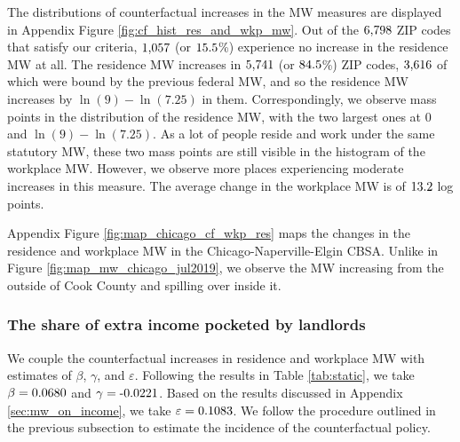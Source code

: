 The distributions of counterfactual increases in the MW measures are displayed 
in Appendix Figure \ref{fig:cf_hist_res_and_wkp_mw}.
Out of the $\textnormal{6,798}$ ZIP codes that satisfy our criteria, 
$\textnormal{1,057}$ (or $\textnormal{15.5}$\%) experience no increase in 
the residence MW at all.
The residence MW increases in $\textnormal{5,741}$ (or $\textnormal{84.5}$\%) ZIP 
codes, $\textnormal{3,616}$ of which were bound by the previous federal MW, and 
so the residence MW increases by $\ln(9)-\ln(7.25)$ in them.
Correspondingly, we observe mass points in the distribution of the residence MW,
with the two largest ones at $0$ and $\ln(9)-\ln(7.25)$.
As a lot of people reside and work under the same statutory MW, these two mass
points are still visible in the histogram of the workplace MW.
However, we observe more places experiencing moderate increases in this measure.
The average change in the workplace MW is of $\textnormal{13.2}$ log points.

Appendix Figure \ref{fig:map_chicago_cf_wkp_res} maps the changes in the 
residence and workplace MW in the Chicago-Naperville-Elgin CBSA.
Unlike in Figure \ref{fig:map_mw_chicago_jul2019}, we observe the MW increasing 
from the outside of Cook County and spilling over inside it.

\subsubsection*{The share of extra income pocketed by landlords}
\label{sec:cf_rents_and_wage_changes}

We couple the counterfactual increases in residence and workplace MW with 
estimates of $\beta$, $\gamma$, and $\varepsilon$.
Following the results in Table \ref{tab:static}, we take 
$\beta = \textnormal{0.0680}$ and 
$\gamma = \textnormal{-0.0221}$.
Based on the results discussed in Appendix \ref{sec:mw_on_income}, we take
$\varepsilon = \textnormal{0.1083}$.
We follow the procedure outlined in the previous subsection to estimate the 
incidence of the counterfactual policy.

